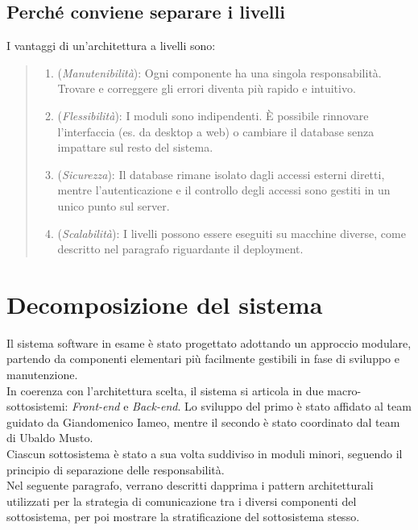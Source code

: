 \subsection{Perché conviene separare i livelli}
I vantaggi di un'architettura a livelli sono:

\begin{quote}
\begin{enumerate}[label=\textit{\arabic*}]
   \item (\textit{Manutenibilità}): Ogni componente ha una singola responsabilità. Trovare e correggere gli errori diventa più rapido e intuitivo.
  
  \item (\textit{Flessibilità}): I moduli sono indipendenti. È possibile rinnovare l'interfaccia (es. da desktop a web) o cambiare il database senza impattare sul resto del sistema.

  \item (\textit{Sicurezza}): Il database rimane isolato dagli accessi esterni diretti, mentre l'autenticazione e il controllo degli accessi sono gestiti in un unico punto sul server. 
  
  \item (\textit{Scalabilità}): I livelli possono essere eseguiti 
  su macchine diverse, come descritto nel paragrafo riguardante il deployment.
\end{enumerate} 
\end{quote}

\section{Decomposizione del sistema}
Il sistema software in esame è stato progettato adottando un approccio modulare, partendo da componenti elementari più facilmente gestibili in fase di sviluppo e manutenzione. \\
\indent In coerenza con l'architettura scelta, il sistema si articola in due macro-sottosistemi: \textit{Front-end} e \textit{Back-end}. Lo sviluppo del primo è stato affidato al team guidato da Giandomenico Iameo, mentre il secondo è stato coordinato dal team di Ubaldo Musto. \\
Ciascun sottosistema è stato a sua volta suddiviso in moduli minori, seguendo il principio di separazione delle responsabilità. \\
\indent Nel seguente paragrafo, verrano descritti dapprima i pattern architetturali utilizzati per la strategia di comunicazione tra i diversi componenti del sottosistema, per poi mostrare la stratificazione del sottosistema stesso.

